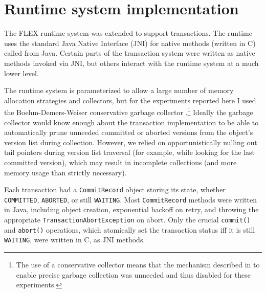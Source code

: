 \section{Runtime system implementation}
The FLEX runtime system was extended to support transactions.  The
runtime uses the standard Java Native Interface (JNI) \cite{JNI} for
native methods (written in C) called from Java.  Certain parts of the
transaction system were written as native methods invoked via JNI, but
others interact with the runtime system at a much lower level.
  
The runtime system is parameterized to allow a large number of memory
allocation strategies and collectors, but for the experiments reported
here I used the Boehm-Demers-Weiser conservative garbage collector
\cite{BoehmDeWe91}.\footnote{The use of a conservative collector means
  that the mechanism described in  to enable
  precise garbage collection was unneeded and thus disabled for these
  experiments.} 
Ideally the garbage collector would know enough about the transaction
implementation to be able to automatically prune unneeded committed or
aborted versions from the object's version list during collection.
However, we relied on opportunistically nulling out tail pointers
during version list traversal (for example, while looking for the
last committed version), which may result in incomplete collections
(and more memory usage than strictly necessary).

Each transaction had a \texttt{CommitRecord} object storing its state,
whether \texttt{COMMITTED}, \texttt{ABORTED}, or still
\texttt{WAITING}.  Most \texttt{CommitRecord} methods were written in
Java, including object creation, exponential backoff on retry, and
throwing the appropriate \texttt{TransactionAbortException} on abort.
Only the crucial \texttt{commit()} and \texttt{abort()} operations,
which atomically set the transaction status iff it is still
\texttt{WAITING}, were written in C, as JNI methods.

